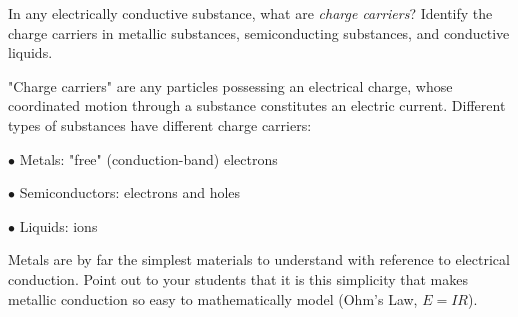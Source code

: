 

In any electrically conductive substance, what are {\it charge carriers}?  Identify the charge carriers in metallic substances, semiconducting substances, and conductive liquids.







"Charge carriers" are any particles possessing an electrical charge, whose coordinated motion through a substance constitutes an electric current.  Different types of substances have different charge carriers:

\medskip
\item{$\bullet$} Metals: "free" (conduction-band) electrons
\item{$\bullet$} Semiconductors: electrons and holes
\item{$\bullet$} Liquids: ions
\medskip







Metals are by far the simplest materials to understand with reference to electrical conduction.  Point out to your students that it is this simplicity that makes metallic conduction so easy to mathematically model (Ohm's Law, $E = I R$).




